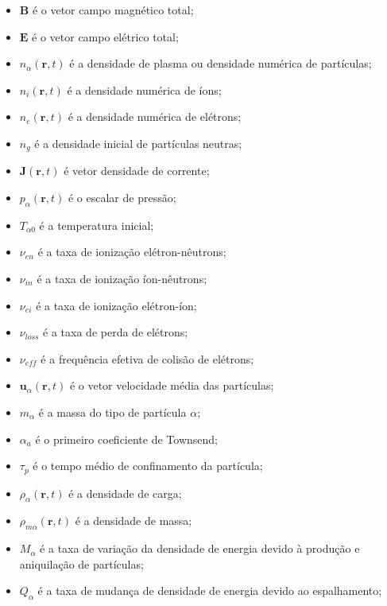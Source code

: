 \documentclass[12pt,oneside,a4paper]{abntex2}
\begin{document}
\begin{itemize}
\item $\bm{B}$ é o vetor campo magnético total;%
\item $\bm{E}$ é o vetor campo elétrico total; %
\item $n_{\alpha}(\bm{r},t)$ é a densidade de plasma ou densidade numérica de partículas; %
\item $n_i(\bm{r},t)$ é a densidade numérica de íons;
\item $n_e(\bm{r},t)$ é a densidade numérica de elétrons;
\item $n_g$ é a densidade inicial de partículas neutras;
\item $\bm{J}(\bm{r},t)$ é vetor densidade de corrente; %
\item $p_\alpha(\bm{r},t)$ é o escalar de pressão;
\item $T_{\alpha 0}$ é a temperatura inicial; %
\item $\nu_{en}$ é a taxa de ionização elétron-nêutrons; %
\item $\nu_{in}$ é a taxa de ionização íon-nêutrons;
\item $\nu_{ei}$ é a taxa de ionização elétron-íon;
\item $\nu_{loss}$ é a taxa de perda de elétrons;
\item $\nu_{eff}$ é a frequência efetiva de colisão de elétrons;%
\item $\bm{u}_{\alpha}(\bm{r},t)$ é o vetor velocidade média das partículas; %
\item $m_\alpha$ é a massa do tipo de partícula $\alpha$; %
\item $\alpha_a$ é o primeiro coeficiente de Townsend;
\item $\tau_p$ é o tempo médio de confinamento da partícula;
\item $\rho_\alpha(\bm{r},t)$ é a densidade de carga;
\item $\rho_{m\alpha}(\bm{r},t)$ é a densidade de massa;
\item $M_\alpha$ é a taxa de variação da densidade de energia devido à produção e aniquilação de partículas;
\item $Q_\alpha$ é a taxa de mudança de densidade de energia devido ao espalhamento;

\end{itemize}
\end{document}
